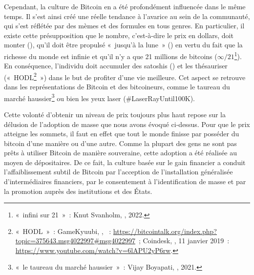 Cependant, la culture de Bitcoin en a été profondément influencée dans le même temps. Il s'est ainsi créé une réelle tendance à l'avarice au sein de la communauté, qui s'est réflétée par des mèmes et des formules en tous genres. En particulier, il existe cette présupposition que le nombre, c'est-à-dire le prix en dollars, doit monter (), qu'il doit être propulsé «~jusqu'à la lune~» () en vertu du fait que la richesse du monde est infinie et qu'il n'y a que 21 millions de bitcoins ($\infty / 21$\footnote{«~infini sur 21~»~: Knut Svanholm, , 2022.}). En conséquence, l'individu doit accumuler des satoshis () et les thésauriser («~HODL\footnote{«~HODL~»~: GameKyuubi, , ~: \url{https://bitcointalk.org/index.php?topic=375643.msg4022997\#msg4022997}~; Coindesk, , 11 janvier 2019~: \url{https://www.youtube.com/watch?v=6lAPU2yP6rw}.}~») dans le but de profiter d'une vie meilleure. Cet aspect se retrouve dans les représentations de Bitcoin et des bitcoineurs, comme le taureau du marché haussier\footnote{«~le taureau du marché haussier~»~: Vijay Boyapati, , 2021.} ou bien les yeux laser (\#LaserRayUntil100K). %

Cette volonté d'obtenir un niveau de prix toujours plus haut repose sur la délusion de l'adoption de masse que nous avons évoqué ci-dessus. Pour que le prix atteigne les sommets, il faut en effet que tout le monde finisse par posséder du bitcoin d'une manière ou d'une autre. Comme la plupart des gens ne sont pas prêts à utiliser Bitcoin de manière souveraine, cette adoption a été réalisée au moyen de dépositaires. De ce fait, la culture basée sur le gain financier a conduit l'affaiblissement subtil de Bitcoin par l'acception de l'installation généralisée d'intermédiaires financiers, par le consentement à l'identification de masse et par la promotion auprès des institutions et des États. %

